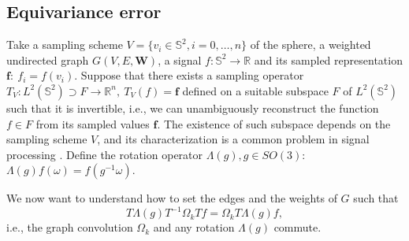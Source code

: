 \documentclass{article} %
\newcommand{\todo}[1]{{\color[rgb]{.6,.1,.6}{#1}}}
\begin{document}
\subsection{Equivariance error}

\todo{
* define a measure of equiv error \\
* show convergence empirically (for Nside up to 1024) \\
* improved upon V1 \\
* no difference in practice (see experiment xx) $\Rightarrow$ NNs are resilient to equiv error \\
}

Take a sampling scheme $V=\{v_i\in\mathbb S^2, i=0, \dots, n\}$ of the sphere, a weighted undirected graph $G(V, E, \mathbf W)$, a signal $f: \mathbb S^2\to\mathbb R$ and its sampled representation $\mathbf f:\ f_i=f(v_i)$. Suppose that there exists a sampling operator $T_V: L^2(\mathbb S^2) \supset F\to \mathbb R^n,\  T_V(f) = \mathbf f$ defined on a suitable subspace $F$ of $L^2(\mathbb S^2)$ such that it is invertible, i.e., we can unambiguously reconstruct the function $f\in F$ from its sampled values $\mathbf f$. The existence of such subspace depends on the sampling scheme $V$, and its characterization is a common problem in signal processing \cite{Driscoll:1994:CFT:184069.184073}. Define the rotation operator $\Lambda(g), g\in SO(3)$: $\Lambda(g) f(\omega) = f\left(g^{-1} \omega\right)$.

We now want to understand how to set the edges and the weights of $G$ such that
\begin{equation} \label{eq:equivariance}
	T \Lambda(g) T^{-1} \Omega_k T f = \Omega_k T \Lambda(g) f,
\end{equation}
i.e., the graph convolution $\Omega_k$ and any rotation $\Lambda(g)$ commute.
\end{document}
